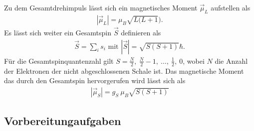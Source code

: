 Zu dem Gesamtdrehimpuls lässt sich ein magnetisches Moment $\vec{\mu}_L$ aufstellen als
\begin{align}
	|\vec{\mu}_L|=\mu_B\sqrt{L(L+1}).
\end{align}
Es lässt sich weiter ein Gesamtspin $\vec{S}$ definieren als
\begin{align}
	\vec{S}=\sum_is_i \text{ mit } |\vec{S}|=\sqrt{S(S+1)}\hbar.
\end{align}
Für die Gesamtspinquantenzahl gilt $S=\frac{N}{2},\ \frac{N}{2}-1 ,\ \dots,\ \frac{1}{2},\ 0$, wobei $N$ die Anzahl der Elektronen der nicht abgeschlossenen Schale ist.
Das magnetische Moment das durch den Gesamtspin hervorgerufen wird lässt sich als 
\begin{align}
	|\vec{\mu}_S|=g_S\ \mu_B\sqrt{S(S+1)}
\end{align}




\subsection{Vorbereitungaufgaben}
\newpage

